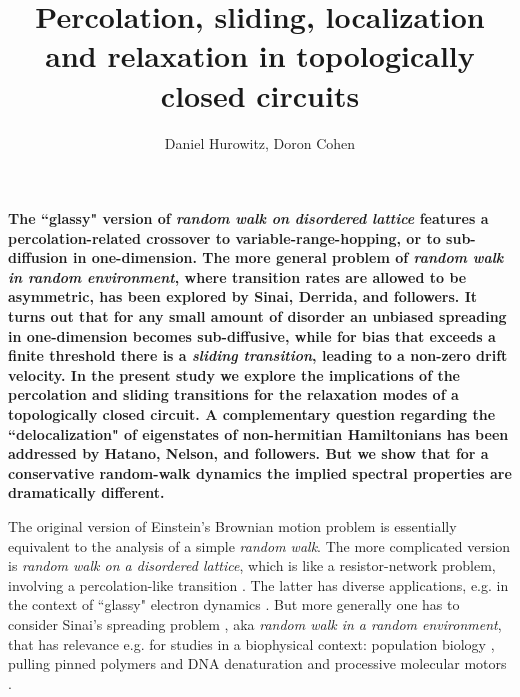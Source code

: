 \documentclass[aps,pre,floats,floatfix,twocolumn]{revtex4}
\newcommand{\rmrk}[1]{{\color[rgb]{0.6,0,0.1} #1}}
\begin{document}
 
\title{Percolation, sliding, localization and relaxation in topologically closed circuits}

\author{Daniel Hurowitz, Doron Cohen}



\maketitle

{\bf
The ``glassy" version of {\em random walk on disordered lattice}  
features a percolation-related crossover to variable-range-hopping,
or to sub-diffusion in one-dimension.  
The more general problem of {\em random walk in random environment}, 
where transition rates are allowed to be asymmetric, 
has been explored by Sinai, Derrida, and followers.  
It turns out that for any small amount of disorder 
an unbiased spreading in one-dimension becomes sub-diffusive,  
while for bias that exceeds a finite threshold there 
is a {\em sliding transition}, leading to a non-zero drift velocity.
%
In the present study we explore the implications of the percolation and sliding transitions 
for the relaxation modes of a topologically closed circuit. 
A complementary question regarding  the ``delocalization" of eigenstates 
of non-hermitian Hamiltonians has been addressed by Hatano, Nelson, and followers. 
But we show that for a conservative random-walk dynamics 
the implied spectral properties are dramatically different.
}


The original version of Einstein's Brownian motion problem
is essentially equivalent to the analysis of a simple {\em random walk}. 
The more complicated version is {\em random walk on a disordered lattice},  
which is like a resistor-network problem, 
involving a percolation-like transition \cite{Alexander}.  
The latter has diverse applications, e.g. 
in the context of ``glassy" electron dynamics \cite{ege,egt}. 
%
But more generally one has to consider Sinai's spreading problem \cite{Sinai,odh1,odh3,BouchaudReview}, 
aka {\em random walk in a random environment}, 
that has relevance e.g. for studies in a biophysical context: 
population biology \cite{popbio,popbio2}, pulling pinned polymers and DNA denaturation \cite{DNA1,DNA2} and \rmrk{processive molecular motors} \cite{fisher1999force,rief2000myosin}.
\end{document}
